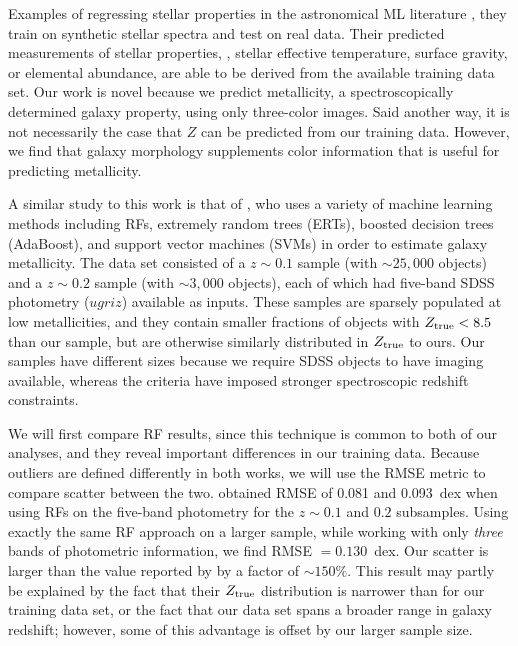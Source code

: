 \documentclass[fleqn,usenatbib]{mnras}
\begin{document}
Examples of regressing stellar properties in the astronomical ML literature , they train on synthetic stellar spectra and test on real data. Their predicted measurements of stellar properties, \eg, stellar effective temperature, surface gravity, or elemental abundance, are able to be derived from the available training data set. Our work is novel because we predict metallicity, a spectroscopically determined galaxy property, using only three-color images. Said another way, it is not necessarily the case that $Z$ can be predicted from our training data. However, we find that galaxy morphology supplements color information that is useful for predicting metallicity.

A similar study to this work is that of \cite{Acquaviva2016}, who uses a variety of machine learning methods including RFs, extremely random trees (ERTs), boosted decision trees (AdaBoost), and support vector machines (SVMs) in order to estimate galaxy metallicity. The \cite{Acquaviva2016} data set consisted of a $z \sim 0.1$ sample (with $\sim 25,000$ objects) and a $z \sim 0.2$ sample (with $\sim 3,000$ objects), each of which had five-band SDSS photometry ($ugriz$) available as inputs. These samples are sparsely populated at low metallicities, and they contain smaller fractions of objects with $Z_{\rm true} < 8.5$ than our sample, but are otherwise similarly distributed in $Z_{\rm true}$ to ours. Our samples have different sizes because we require SDSS objects to have imaging available, whereas the \cite{Acquaviva2016} criteria have imposed stronger spectroscopic redshift constraints.

We will first compare RF results, since this technique is common to both of our analyses, and they reveal important differences in our training data. Because outliers are defined differently in both works, we will use the RMSE metric to compare scatter between the two. \cite{Acquaviva2016} obtained RMSE of 0.081 and 0.093~dex when using RFs on the five-band photometry for the $z \sim 0.1$ and $0.2$ subsamples. Using exactly the same RF approach on a larger sample, while working with only \textit{three} bands of photometric information, we find RMSE $= 0.130$~dex. Our scatter is larger than the value reported by \cite{Acquaviva2016} by a factor of $\sim 150\%$. This result may partly be explained by the fact that their $Z_{\rm true}$ distribution is narrower than for our training data set, or the fact that our data set spans a broader range in galaxy redshift; however, some of this advantage is offset by our larger sample size.
\end{document}
